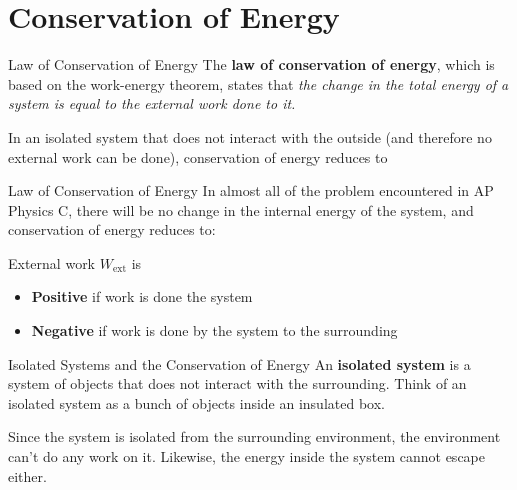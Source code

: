 \documentclass[12pt,compress,aspectratio=169]{beamer}
\begin{document}
\section{Conservation of Energy}

\begin{frame}{Law of Conservation of Energy}
  The \textbf{law of conservation of energy}, which is based on the work-energy
  theorem, states that \emph{the change in the total energy of a system is
    equal to the external work done to it.}


  In an isolated system that does not interact with the outside (and therefore
  no external work can be done), conservation of energy reduces to


\end{frame}



\begin{frame}{Law of Conservation of Energy}
  In almost all of the problem encountered in AP Physics C, there will be no
  change in the internal energy of the system, and conservation of energy
  reduces to:
  

  External work $W_\text{ext}$ is
  \begin{itemize}
  \item\textbf{Positive} if work is done  the system
  \item\textbf{Negative} if work is done  by the system to the
    surrounding
  \end{itemize}
\end{frame}



\begin{frame}{Isolated Systems and the Conservation of Energy}
  An \textbf{isolated system} is a system of objects that does not interact with
  the surrounding. Think of an isolated system as a bunch of objects inside an
  insulated box.
  \begin{center}
  \end{center}
  Since the system is isolated from the surrounding environment, the
  environment can't do any work on it. Likewise, the energy inside the system
  cannot escape either.
\end{frame}
\end{document}
